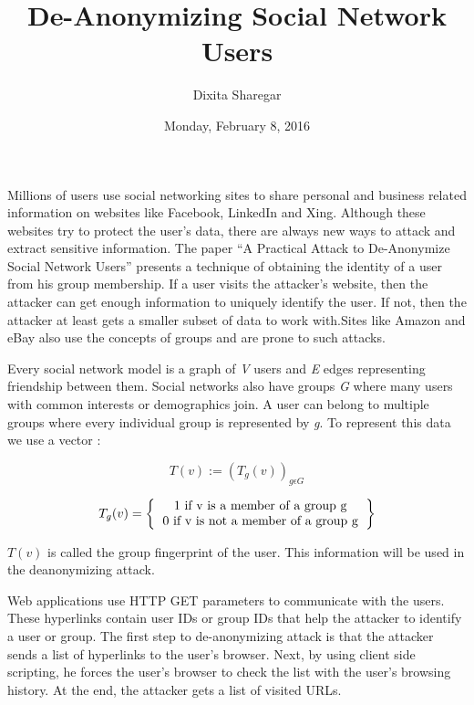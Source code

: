 \documentclass{article}
\title {De-Anonymizing Social Network Users}
\author{Dixita Sharegar}
\date{Monday, February 8, 2016}
\begin{document}
\maketitle
Millions of users use social networking sites to share personal and business related information on websites like Facebook, LinkedIn and Xing. Although these websites try to protect the user’s data, there are always new ways to attack and extract sensitive information. The paper “A Practical Attack to De-Anonymize Social Network Users” presents a technique of obtaining the identity of a user from his group membership. If a user visits the attacker’s website, then the attacker can get enough information to uniquely identify the user. If not, then the attacker at least gets a smaller subset of data to work with.Sites like Amazon and eBay also use the concepts of groups and are prone to such attacks. \\
\par Every social network model is a graph of \textit{V} users and \textit{E} edges representing friendship between them. Social networks also have groups \textit{G} where many users with common interests or demographics join. A user can belong to multiple groups where every individual group is represented by \textit{g}. To represent this data we use a vector :

\begin{equation}
T(v):=(T_g(v))_{g \epsilon G}
\end{equation}

$$T_g(v)= 
\left
 \{
  \begin{tabular}{ccc}
  1 if v is a member of a group g\\
  0 if v is not a member of a group g
  \end{tabular}
\right \}$$


 \(T(v)\)  is called the group fingerprint of the user. This information will be used in the deanonymizing attack. \\
\par Web applications use HTTP GET parameters to communicate with the users. These hyperlinks contain user IDs or group IDs that help the attacker to identify a user or group. The first step to de-anonymizing attack is that the attacker sends a list of hyperlinks to the user’s browser. Next, by using client side scripting, he forces the user’s browser to check the list with the user’s browsing history. At the end, the attacker gets a list of visited URLs.
\end{document}
